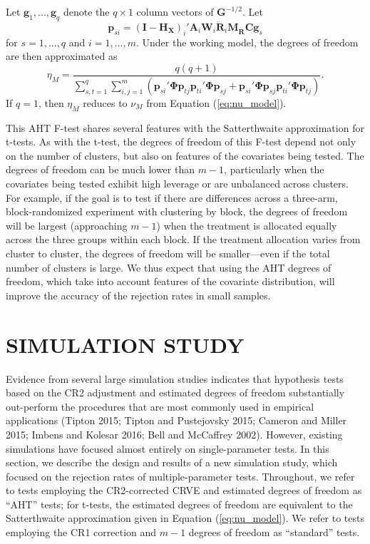 \documentclass[12pt]{article}
\begin{document}
Let \(\mathbf{g}_1,...,\mathbf{g}_q\) denote the \(q \times 1\) column
vectors of \(\mathbf{G}^{-1/2}\). Let \[
\mathbf{p}_{si} = \left(\mathbf{I} - \mathbf{H_X}\right)_i' \mathbf{A}_i \mathbf{W}_i \mathbf{\ddot{R}}_i \mathbf{M_{\ddot{R}}}\mathbf{C} \mathbf{g}_s \]
for \(s = 1,...,q\) and \(i = 1,...,m\). Under the working model, the
degrees of freedom are then approximated as \begin{equation}
\label{eq:eta_model}
\eta_M = \frac{q(q + 1)}{\sum_{s,t=1}^q \sum_{i,j=1}^m \left(\mathbf{p}_{si}'\boldsymbol\Phi\mathbf{p}_{tj} \mathbf{p}_{ti}'\boldsymbol\Phi\mathbf{p}_{sj} + \mathbf{p}_{si}'\boldsymbol\Phi\mathbf{p}_{sj} \mathbf{p}_{ti}'\boldsymbol\Phi\mathbf{p}_{tj}\right)}.
\end{equation} If \(q = 1\), then \(\eta_M\) reduces to \(\nu_M\) from
Equation (\ref{eq:nu_model}).

This AHT F-test shares several features with the Satterthwaite
approximation for t-tests. As with the t-test, the degrees of freedom of
this F-test depend not only on the number of clusters, but also on
features of the covariates being tested. The degrees of freedom can be
much lower than \(m - 1\), particularly when the covariates being tested
exhibit high leverage or are unbalanced across clusters. For example, if
the goal is to test if there are differences across a three-arm,
block-randomized experiment with clustering by block, the degrees of
freedom will be largest (approaching \(m - 1\)) when the treatment is
allocated equally across the three groups within each block. If the
treatment allocation varies from cluster to cluster, the degrees of
freedom will be smaller---even if the total number of clusters is large.
We thus expect that using the AHT degrees of freedom, which take into
account features of the covariate distribution, will improve the
accuracy of the rejection rates in small samples.

\hypertarget{sec:simulation}{%
\section{SIMULATION STUDY}\label{sec:simulation}}

Evidence from several large simulation studies indicates that hypothesis
tests based on the CR2 adjustment and estimated degrees of freedom
substantially out-perform the procedures that are most commonly used in
empirical applications (Tipton 2015; Tipton and Pustejovsky 2015;
Cameron and Miller 2015; Imbens and Kolesar 2016; Bell and McCaffrey
2002). However, existing simulations have focused almost entirely on
single-parameter tests. In this section, we describe the design and
results of a new simulation study, which focused on the rejection rates
of multiple-parameter tests. Throughout, we refer to tests employing the
CR2-corrected CRVE and estimated degrees of freedom as ``AHT'' tests;
for t-tests, the estimated degrees of freedom are equivalent to the
Satterthwaite approximation given in Equation (\ref{eq:nu_model}). We
refer to tests employing the CR1 correction and \(m - 1\) degrees of
freedom as ``standard'' tests.
\end{document}
